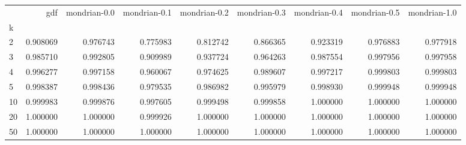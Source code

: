 \begin{tabular}{lrrrrrrrr}
\toprule
{} &       gdf &  mondrian-0.0 &  mondrian-0.1 &  mondrian-0.2 &  mondrian-0.3 &  mondrian-0.4 &  mondrian-0.5 &  mondrian-1.0 \\
k  &           &               &               &               &               &               &               &               \\
\midrule
2  &  0.908069 &      0.976743 &      0.775983 &      0.812742 &      0.866365 &      0.923319 &      0.976883 &      0.977918 \\
3  &  0.985710 &      0.992805 &      0.909989 &      0.937724 &      0.964263 &      0.987554 &      0.997956 &      0.997958 \\
4  &  0.996277 &      0.997158 &      0.960067 &      0.974625 &      0.989607 &      0.997217 &      0.999803 &      0.999803 \\
5  &  0.998387 &      0.998436 &      0.979535 &      0.986982 &      0.995979 &      0.998930 &      0.999948 &      0.999948 \\
10 &  0.999983 &      0.999876 &      0.997605 &      0.999498 &      0.999858 &      1.000000 &      1.000000 &      1.000000 \\
20 &  1.000000 &      1.000000 &      0.999926 &      1.000000 &      1.000000 &      1.000000 &      1.000000 &      1.000000 \\
50 &  1.000000 &      1.000000 &      1.000000 &      1.000000 &      1.000000 &      1.000000 &      1.000000 &      1.000000 \\
\bottomrule
\end{tabular}

